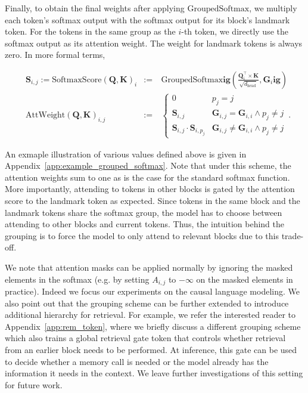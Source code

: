 Finally, to obtain the final weights after applying $\mathrm{GroupedSoftmax}$, we multiply each token's softmax output with the softmax output for its block's landmark token. For the tokens in the same group as the $i$-th token, we directly use the softmax output as its attention weight. The weight for landmark tokens is always zero. In more formal terms,

\begin{align}
	&\mathbf{S}_{i, j} := \mathrm{SoftmaxScore}(\mathbf{Q}, \mathbf{K})_{i}  &:=~&  \mathrm{GroupedSoftmax}\mathbf{ig}( \frac{\mathbf{Q}_i^\top \times \mathbf{K}}{\sqrt{d_\text{head}}}, \mathbf{G}_i\mathbf{ig}) \\
	&\mathrm{AttWeight}(\mathbf{Q}, \mathbf{K})_{i, j} &:=~& \begin{cases}
		0 & p_j = j\\
		\mathbf{S}_{i, j} & \mathbf{G}_{i, j} = \mathbf{G}_{i, i} \wedge p_j \neq j \\
		\mathbf{S}_{i, j} \cdot \mathbf{S}_{i, p_j} & \mathbf{G}_{i, j} \neq \mathbf{G}_{i, i} \wedge p_j \neq j 
	\end{cases} \, .
\end{align}

An exmaple illustration of various values defined above is given in Appendix~\ref{app:example_grouped_softmax}. Note that under this scheme, the attention weights sum to one as is the case for the standard softmax function. More importantly, attending to tokens in other blocks is gated by the attention score to the landmark token as expected. Since tokens in the same block and the landmark tokens share the softmax group, the model has to choose between attending to other blocks and current tokens. Thus, the intuition behind the grouping is to force the model to only attend to relevant blocks due to this trade-off. 

We note that attention masks can be applied normally by ignoring the masked elements in the softmax (e.g. by setting $A_{i, j}$ to $-\infty$ on the masked elements in practice). Indeed we focus our experiments on the causal language modeling. We also point out that the grouping scheme can be further extended to introduce additional hierarchy for retrieval. For example, we refer the interested reader to Appendix~\ref{app:rem_token}, where we briefly discuss a different grouping scheme which also trains a global retrieval gate token that controls whether retrieval from an earlier block needs to be performed. At inference, this gate can be used to decide whether a memory call is needed or the model already has the information it needs in the context. We leave further investigations of this setting for future work. 

